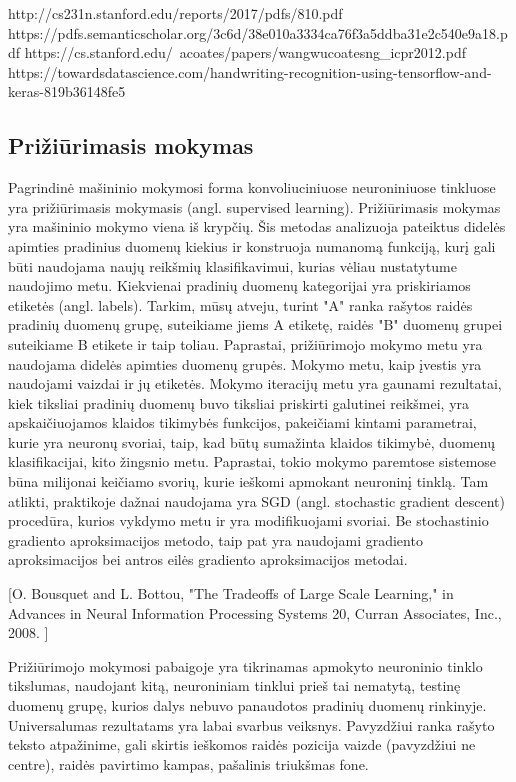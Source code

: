 \documentclass{VUMIFInfBakalaurinis}
\begin{document}
http://cs231n.stanford.edu/reports/2017/pdfs/810.pdf
https://pdfs.semanticscholar.org/3c6d/38e010a3334ca76f3a5ddba31e2c540e9a18.pdf
https://cs.stanford.edu/~acoates/papers/wangwucoatesng_icpr2012.pdf
https://towardsdatascience.com/handwriting-recognition-using-tensorflow-and-keras-819b36148fe5


\subsection{Prižiūrimasis mokymas}

Pagrindinė mašininio mokymosi forma konvoliuciniuose neuroniniuose tinkluose yra prižiūrimasis mokymasis (angl. supervised learning). Prižiūrimasis mokymas yra mašininio mokymo viena iš krypčių. Šis metodas analizuoja pateiktus didelės apimties pradinius duomenų kiekius ir konstruoja numanomą funkciją, kurį gali būti naudojama naujų reikšmių klasifikavimui, kurias vėliau nustatytume naudojimo metu. Kiekvienai pradinių duomenų kategorijai yra priskiriamos etiketės (angl. labels). Tarkim, mūsų atveju, turint "A" ranka rašytos raidės pradinių duomenų grupę, suteikiame jiems A etiketę, raidės "B" duomenų grupei suteikiame B etikete ir taip toliau. Paprastai, prižiūrimojo mokymo metu yra naudojama didelės apimties duomenų grupės. Mokymo metu, kaip įvestis yra naudojami vaizdai ir jų etiketės. Mokymo iteracijų metu yra gaunami rezultatai, kiek tiksliai pradinių duomenų buvo tiksliai priskirti galutinei reikšmei, yra apskaičiuojamos klaidos tikimybės funkcijos, pakeičiami kintami parametrai, kurie yra neuronų svoriai, taip, kad būtų sumažinta klaidos tikimybė, duomenų klasifikacijai, kito žingsnio metu. Paprastai, tokio mokymo paremtose sistemose būna milijonai keičiamo svorių, kurie ieškomi apmokant neuroninį tinklą. Tam atlikti, praktikoje dažnai naudojama yra SGD (angl. stochastic gradient descent) procedūra, kurios vykdymo metu ir yra modifikuojami svoriai. Be stochastinio gradiento aproksimacijos metodo, taip pat yra naudojami gradiento aproksimacijos bei antros eilės gradiento aproksimacijos metodai.

[O. Bousquet and L. Bottou, "The Tradeoffs of Large Scale Learning," in Advances in Neural Information Processing Systems 20, Curran Associates, Inc., 2008. ]
 
Prižiūrimojo mokymosi pabaigoje yra tikrinamas apmokyto neuroninio tinklo tikslumas, naudojant kitą, neuroniniam tinklui prieš tai nematytą, testinę duomenų grupę, kurios dalys nebuvo panaudotos pradinių duomenų rinkinyje. Universalumas rezultatams yra labai svarbus veiksnys. Pavyzdžiui ranka rašyto teksto atpažinime, gali skirtis ieškomos raidės pozicija vaizde (pavyzdžiui ne centre), raidės pavirtimo kampas, pašalinis triukšmas fone.
\end{document}
